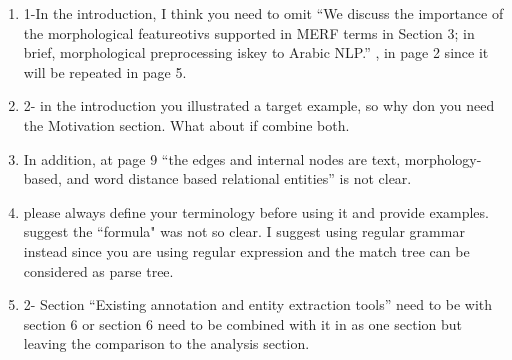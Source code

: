 \begin{enumerate}[leftmargin=0mm,label=\bfseries CommentR3.\arabic*]
\item \label{Review.3.5}
1-In the introduction, I think you need to omit 
    ``We discuss the importance of the morphological featureotivs supported in 
    MERF terms in Section 3; in brief, morphological preprocessing iskey to 
    Arabic NLP.'' , in page 2 since it will be repeated in page 5.


\item \label{Review.3.6}
2- in the introduction you illustrated a target example, 
so why don you need the Motivation section. 
What about if combine both.



\item \label{Review.3.7}
In addition, at page 9 ``the edges and internal nodes are text, 
morphology-based, and word distance based relational entities'' 
is not clear.



\item \label{Review.3.8}
please always define your terminology before using it and 
provide examples. suggest the ``formula" was not so clear. 
I suggest using regular grammar instead since you are using 
regular expression and the match tree can be considered as 
parse tree.



\item \label{Review.3.9}
2- Section ``Existing annotation and entity extraction tools” 
need to be with section 6 or section 6 need to be combined 
with it in as one section but leaving the comparison to 
the analysis section.




\end{enumerate}

